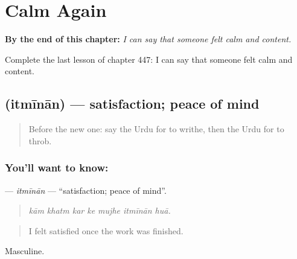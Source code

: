 
\chapter{Calm Again}
\label{ch:ur-calm-again}

\begin{chapteropening}
\textbf{By the end of this chapter:} \emph{I can say that someone felt calm and content.}

Complete the last lesson of chapter 447: I can say that someone felt calm and content.
\end{chapteropening}

\section[\texorpdfstring{\ur{اطمینان} (itmīnān)}{اطمینان (itmīnān)}]{ (itmīnān) — satisfaction; peace of mind}

\label{lesson:UR-C447-itminan}



\begin{quote}
Before the new one: say the Urdu for to writhe, then the Urdu for to throb.
\end{quote}

\subsection*{You'll want to know: }
\textbf{} — \emph{itmīnān} — \textquotedblleft{}satisfaction; peace of mind\textquotedblright{}.

\begin{quote}
      
\end{quote}

\begin{quote}
\emph{kām khatm kar ke mujhe itmīnān huā.}
\end{quote}

\begin{quote}
I felt satisfied once the work was finished.
\end{quote}

Masculine.

